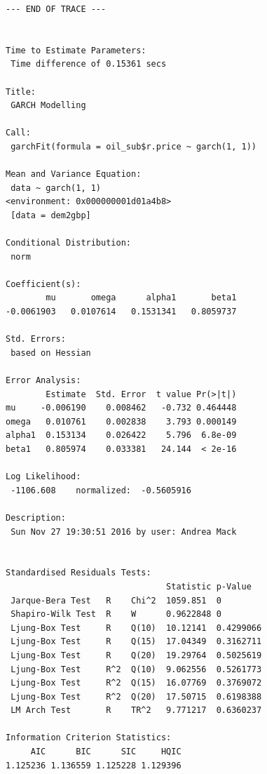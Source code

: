 \documentclass[11pt]{article}\usepackage[]{graphicx}\usepackage[]{color}
\makeatletter
\newenvironment{kframe}{%
 \def\at@end@of@kframe{}%
 \ifinner\ifhmode%
  \def\at@end@of@kframe{\end{minipage}}%
  \begin{minipage}{\columnwidth}%
 \fi\fi%
 \def\FrameCommand##1{\hskip\@totalleftmargin \hskip-\fboxsep
 \colorbox{shadecolor}{##1}\hskip-\fboxsep
     \hskip-\linewidth \hskip-\@totalleftmargin \hskip\columnwidth}%
 \MakeFramed {\advance\hsize-\width
   \@totalleftmargin\z@ \linewidth\hsize
   \@setminipage}}%
 {\par\unskip\endMakeFramed%
 \at@end@of@kframe}
\newenvironment{knitrout}{}{} %
\makeatother
\begin{document}
\begin{knitrout}
\begin{kframe}
\begin{verbatim}
--- END OF TRACE ---


Time to Estimate Parameters:
 Time difference of 0.15361 secs

Title:
 GARCH Modelling 

Call:
 garchFit(formula = oil_sub$r.price ~ garch(1, 1)) 

Mean and Variance Equation:
 data ~ garch(1, 1)
<environment: 0x000000001d01a4b8>
 [data = dem2gbp]

Conditional Distribution:
 norm 

Coefficient(s):
        mu       omega      alpha1       beta1  
-0.0061903   0.0107614   0.1531341   0.8059737  

Std. Errors:
 based on Hessian 

Error Analysis:
        Estimate  Std. Error  t value Pr(>|t|)
mu     -0.006190    0.008462   -0.732 0.464448
omega   0.010761    0.002838    3.793 0.000149
alpha1  0.153134    0.026422    5.796  6.8e-09
beta1   0.805974    0.033381   24.144  < 2e-16

Log Likelihood:
 -1106.608    normalized:  -0.5605916 

Description:
 Sun Nov 27 19:30:51 2016 by user: Andrea Mack 


Standardised Residuals Tests:
                                Statistic p-Value  
 Jarque-Bera Test   R    Chi^2  1059.851  0        
 Shapiro-Wilk Test  R    W      0.9622848 0        
 Ljung-Box Test     R    Q(10)  10.12141  0.4299066
 Ljung-Box Test     R    Q(15)  17.04349  0.3162711
 Ljung-Box Test     R    Q(20)  19.29764  0.5025619
 Ljung-Box Test     R^2  Q(10)  9.062556  0.5261773
 Ljung-Box Test     R^2  Q(15)  16.07769  0.3769072
 Ljung-Box Test     R^2  Q(20)  17.50715  0.6198388
 LM Arch Test       R    TR^2   9.771217  0.6360237

Information Criterion Statistics:
     AIC      BIC      SIC     HQIC 
1.125236 1.136559 1.125228 1.129396 
\end{verbatim}


{\ttfamily\noindent\bfseries\color{errorcolor}{Error in data.frame(c(g8.aic, g121.aic, g11.aic, lm1.aic)): object 'g121.aic' not found}}

{\ttfamily\noindent\bfseries{}}

{\ttfamily\noindent\bfseries{}}

{\ttfamily\noindent\bfseries\color{errorcolor}{Error in xtable(aic\_all): object 'aic\_all' not found}}\end{kframe}
\end{knitrout}
\end{document}

